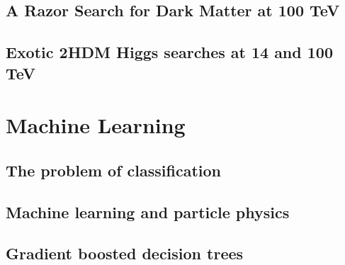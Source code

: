 \documentclass[ %
                openright,
                titlepage,numbers=noenddot,headinclude,%
                footinclude=true,cleardoublepage=empty,abstractoff, 
                BCOR=0mm,paper=a4,fontsize=10pt,
                ngerman,american,
                ]{scrreprt}
\begin{document}
\chapter{A Razor Search for Dark Matter at 100 TeV}
\chapter{Exotic 2HDM Higgs searches at 14 and 100 TeV}
\part{Machine Learning} \chapter{The problem of classification}
\chapter{Machine learning and particle physics}
\chapter{Gradient boosted decision trees}

\appendix
\renewcommand{\thechapter}{\alph{chapter}}
\cleardoublepage
% 
% 
% 
\cleardoublepage
\cleardoublepage
\end{document}
